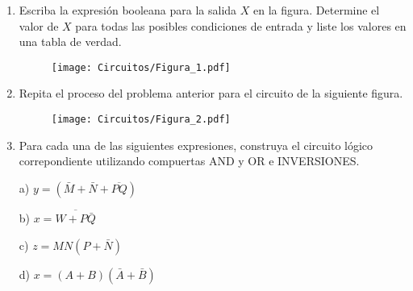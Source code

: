 \documentclass[a4paper, 12pt]{article}
\newcommand{\Aspace}{0.2cm}
\begin{document}
    \begin{enumerate}
        \item Escriba la expresión booleana para la salida $X$ en la figura. Determine el valor de $X$ para todas las posibles condiciones de entrada y liste los valores en una tabla de verdad. \par
        \begin{figure}[!ht]
            \centering
            \texttt{[image: Circuitos/Figura\_1.pdf]}
        \end{figure}
            \vspace{\Aspace} \par
            { \color{azul}  }



        \item Repita el proceso del problema anterior para el circuito de la siguiente figura. \par
        \begin{figure}[!ht]
            \centering
            \texttt{[image: Circuitos/Figura\_2.pdf]}
        \end{figure}
            \vspace{\Aspace} \par
            { \color{azul}  }



        \item Para cada una de las siguientes expresiones, construya el circuito lógico correpondiente utilizando compuertas AND y OR e INVERSIONES.
            \vspace{\Aspace} \par
            a) $y = (\bar{M} + \bar{N} + \overline{PQ})$
            \\ { \color{azul}  }

            \vspace{\Aspace} \par
            b) $x = \overline{W + P\bar{Q}}$
            \\ { \color{azul}  }

            \vspace{\Aspace} \par
            c) $z = MN(P + \bar{N})$
            \\ { \color{azul}  }

            \vspace{\Aspace} \par
            d) $x = (A + B)(\bar{A} + \bar{B})$
            \\ { \color{azul}  }




\end{enumerate}
\end{document}
